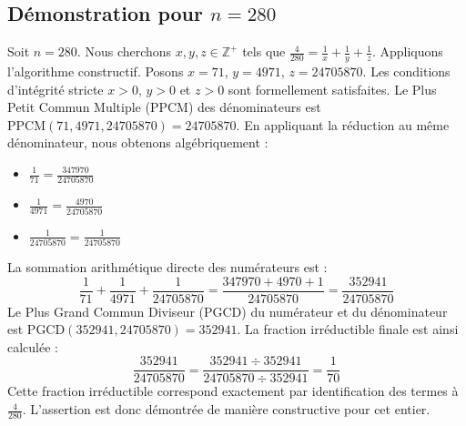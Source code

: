 \documentclass[11pt,a4paper]{article}
\begin{document}
\subsection{Démonstration pour $n = 280$}
Soit $n = 280$. Nous cherchons $x, y, z \in \mathbb{Z}^{+}$ tels que $\frac{4}{280} = \frac{1}{x} + \frac{1}{y} + \frac{1}{z}$.
Appliquons l'algorithme constructif. Posons $x = 71$, $y = 4971$, $z = 24705870$.
Les conditions d'intégrité stricte $x > 0$, $y > 0$ et $z > 0$ sont formellement satisfaites.
Le Plus Petit Commun Multiple (PPCM) des dénominateurs est $\text{PPCM}(71, 4971, 24705870) = 24705870$.
En appliquant la réduction au même dénominateur, nous obtenons algébriquement :
\begin{itemize}
    \item $\frac{1}{71} = \frac{347970}{24705870}$
    \item $\frac{1}{4971} = \frac{4970}{24705870}$
    \item $\frac{1}{24705870} = \frac{1}{24705870}$
\end{itemize}
La sommation arithmétique directe des numérateurs est :
$$ \frac{1}{71} + \frac{1}{4971} + \frac{1}{24705870} = \frac{347970 + 4970 + 1}{24705870} = \frac{352941}{24705870} $$
Le Plus Grand Commun Diviseur (PGCD) du numérateur et du dénominateur est $\text{PGCD}(352941, 24705870) = 352941$.
La fraction irréductible finale est ainsi calculée :
$$ \frac{352941}{24705870} = \frac{352941 \div 352941}{24705870 \div 352941} = \frac{1}{70} $$
Cette fraction irréductible correspond exactement par identification des termes à $\frac{4}{280}$. L'assertion est donc démontrée de manière constructive pour cet entier.
\end{document}
